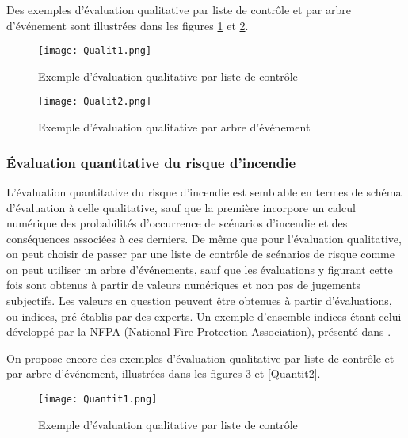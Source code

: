 \documentclass[11pt]{article}
\begin{document}
Des exemples d'évaluation qualitative par liste de contrôle et par arbre d'événement sont illustrées dans les figures \ref{Qualit1} et \ref{Qualit2}.

\begin{figure}
\begin{center}
\texttt{[image: Qualit1.png]}
\end{center}
\caption{Exemple d'évaluation qualitative par liste de contrôle}
\label{Qualit1}
\end{figure}

\begin{figure}
\begin{center}
\texttt{[image: Qualit2.png]}
\end{center}
\caption{Exemple d'évaluation qualitative par arbre d'événement}
\label{Qualit2}
\end{figure}

\subsubsection{Évaluation quantitative du risque d'incendie}

L'évaluation quantitative du risque d'incendie est semblable en termes de schéma d'évaluation à celle qualitative, sauf que la première incorpore un calcul numérique des probabilités d'occurrence de scénarios d'incendie et des conséquences associées à ces derniers. De même que pour l'évaluation qualitative, on peut choisir de passer par une liste de contrôle de scénarios de risque comme on peut utiliser un arbre d'événements, sauf que les évaluations y figurant cette fois sont obtenus à partir de valeurs numériques et non pas de jugements subjectifs. Les valeurs en question peuvent être obtenues à partir d'évaluations, ou indices, pré-établis par des experts. Un exemple d'ensemble indices étant celui développé par la NFPA (National Fire Protection Association), présenté dans \cite{national2004nfpa}.

On propose encore des exemples d'évaluation qualitative par liste de contrôle et par arbre d'événement, illustrées dans les figures \ref{Quantit1} et \ref{Quantit2}.

\begin{figure}
\begin{center}
\texttt{[image: Quantit1.png]}
\end{center}
\caption{Exemple d'évaluation qualitative par liste de contrôle}
\label{Quantit1}
\end{figure}
\end{document}
